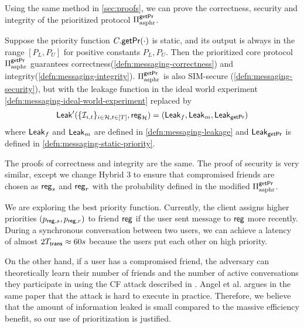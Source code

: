 Using the same method in \cref{sec:proofs}, we can prove the correctness, security and integrity of the prioritized protocol $\Pi^{\mathsf{getPr}}_{\text{asphr}}$.
\begin{theorem}
Suppose the priority function $C.\mathsf{getPr}(\cdot)$ is static, and its output is always in the range $[P_L, P_U]$ for positive constants $P_L, P_U$. Then the prioritized core protocol $\Pi^{\mathsf{getPr}}_{\text{asphr}}$ guarantees correctness(\cref{defn:messaging-correctness}) and integrity(\cref{defn:messaging-integrity}). $\Pi^{\mathsf{getPr}}_{\text{asphr}}$ is also SIM-secure (\cref{defn:messaging-security}), but with the leakage function in the ideal world experiment \cref{defn:messaging-ideal-world-experiment} replaced by
$$\mathsf{Leak}'(\{\mathcal{I}_{i, t}\}_{i \in \mathcal{H}, t \in [T]}, \mathsf{reg}_{\mathcal{H}}) = (\mathsf{Leak}_f, \mathsf{Leak}_m, \mathsf{Leak}_{\mathsf{getPr}})$$
where $\mathsf{Leak}_f$ and $\mathsf{Leak}_m$ are defined in \cref{defn:messaging-leakage} and $\mathsf{Leak}_{\mathsf{getPr}}$ is defined in \cref{defn:messaging-static-priority}.
\end{theorem}

The proofs of correctness and integrity are the same. The proof of security is very similar, except we change Hybrid 3 to ensure that compromised friends are chosen as $\mathsf{reg}_s$ and $\mathsf{reg}_r$ with the probability defined in the modified $\Pi^{\mathsf{getPr}}_{\text{asphr}}$.

We are exploring the best priority function. Currently, the client assigns higher priorities $(p_{\mathsf{reg}, s}, p_{\mathsf{reg}, r})$ to friend $\mathsf{reg}$ if the user sent message to $\mathsf{reg}$ more recently. During a synchronous conversation between two users, we can achieve a latency of almost $2T_{\mathsf{trans}} \approx 60s$ because the users put each other on high priority. 

On the other hand, if a user has a compromised friend, the adversary can theoretically learn their number of friends and the number of active conversations they participate in using the CF attack described in \cite{angel2018cf}. Angel et al. argues in the same paper that the attack is hard to execute in practice. Therefore, we believe that the amount of information leaked is small compared to the massive efficiency benefit, so our use of prioritization is justified.

